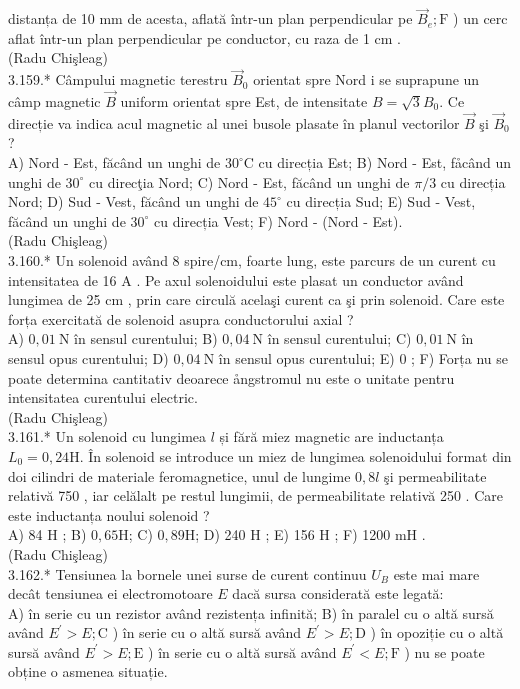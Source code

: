 \documentclass[10pt]{article}
\begin{document}
distanța de 10 mm de acesta, aflată într-un plan perpendicular pe $\vec{B}_{e} ; \mathrm{F}$ ) un cerc aflat într-un plan perpendicular pe conductor, cu raza de 1 cm .\\
(Radu Chişleag)\\
3.159.* Câmpului magnetic terestru $\vec{B}_{0}$ orientat spre Nord i se suprapune un câmp magnetic $\vec{B}$ uniform orientat spre Est, de intensitate $B=\sqrt{3} B_{0}$. Ce direcție va indica acul magnetic al unei busole plasate în planul vectorilor $\vec{B}$ şi $\vec{B}_{0}$ ?\\
A) Nord - Est, făcând un unghi de $30^{\circ} \mathrm{C}$ cu direcția Est; B) Nord - Est, fåcând un unghi de $30^{\circ}$ cu direcţia Nord; C) Nord - Est, făcând un unghi de $\pi / 3$ cu direcția Nord; D) Sud - Vest, făcând un unghi de $45^{\circ}$ cu direcția Sud; E) Sud - Vest, făcând un unghi de $30^{\circ}$ cu direcția Vest; F) Nord - (Nord - Est).\\
(Radu Chişleag)\\
3.160.* Un solenoid având 8 spire/cm, foarte lung, este parcurs de un curent cu intensitatea de 16 A . Pe axul solenoidului este plasat un conductor având lungimea de 25 cm , prin care circulă acelaşi curent ca şi prin solenoid. Care este forța exercitată de solenoid asupra conductorului axial ?\\
A) $0,01 \mathrm{~N}$ în sensul curentului; B) $0,04 \mathrm{~N}$ în sensul curentului; C) $0,01 \mathrm{~N}$ în sensul opus curentului; D) $0,04 \mathrm{~N}$ în sensul opus curentului; E) 0 ; F) Forța nu se poate determina cantitativ deoarece ångstromul nu este o unitate pentru intensitatea curentului electric.\\
(Radu Chişleag)\\
3.161.* Un solenoid cu lungimea $l$ și fără miez magnetic are inductanța $L_{0}=0,24 \mathrm{H}$. În solenoid se introduce un miez de lungimea solenoidului format din doi cilindri de materiale feromagnetice, unul de lungime $0,8 l$ şi permeabilitate relativă 750 , iar celălalt pe restul lungimii, de permeabilitate relativă 250 . Care este inductanța noului solenoid ?\\
A) 84 H ; B) $0,65 \mathrm{H}$; C) $0,89 \mathrm{H}$; D) 240 H ; E) 156 H ; F) 1200 mH .\\
(Radu Chişleag)\\
3.162.* Tensiunea la bornele unei surse de curent continuu $U_{B}$ este mai mare decât tensiunea ei electromotoare $E$ dacă sursa considerată este legată:\\
A) în serie cu un rezistor având rezistența infinită; B) în paralel cu o altă sursă având $E^{\prime}>E ; \mathrm{C}$ ) în serie cu o altă sursă având $E^{\prime}>E ; \mathrm{D}$ ) în opoziție cu o altă sursă având $E^{\prime}>E ; \mathrm{E}$ ) în serie cu o altă sursă având $E^{\prime}<E ; \mathrm{F}$ ) nu se poate obține o asmenea situație.\\
\end{document}
